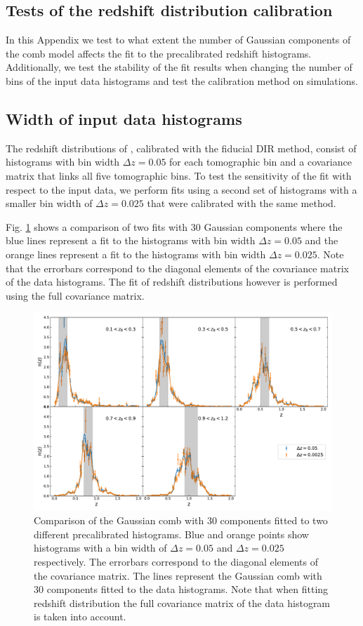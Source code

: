 \documentclass{aa}
\begin{document}
\begin{appendix}
\section{Tests of the redshift distribution calibration}
\label{ap:calibration}
In this Appendix we test to what extent the number of Gaussian components of the comb model affects the fit to the precalibrated redshift histograms. Additionally, we test the stability of the fit results when changing the number of bins of the input data histograms and test the calibration method on simulations.
\subsection{Width of input data histograms}
\label{ap:calibration_input}
The redshift distributions of \cite{hildebrandt18}, calibrated with the fiducial DIR method, consist of histograms with bin width $\Delta z = 0.05$ for each tomographic bin and a covariance matrix that links all five tomographic bins. To test the sensitivity of the fit with respect to the input data, we perform fits using a second set of histograms with a smaller bin width of $\Delta z = 0.025$ that were calibrated with the same method. 

Fig. \ref{fig:120vs240} shows a comparison of two fits with 30 Gaussian components where the blue lines represent a fit to the histograms with bin width $\Delta z = 0.05$ and the orange lines represent a fit to the histograms with bin width $\Delta z = 0.025$. Note that the errorbars correspond to the diagonal elements of the covariance matrix of the data histograms. The fit of redshift distributions however is performed using the full covariance matrix.
\begin{figure}
\centering
\includegraphics[width=\linewidth]{plots/calibration_bin_width.pdf}
\caption{Comparison of the Gaussian comb with 30 components fitted to two different precalibrated histograms. Blue and orange points show histograms with a bin width of $\Delta z = 0.05$ and $\Delta z = 0.025$ respectively. The errorbars correspond to the diagonal elements of the covariance matrix. The lines represent the Gaussian comb with 30 components fitted to the data histograms. Note that when fitting redshift distribution the full covariance matrix of the data histogram is taken into account.}
\label{fig:120vs240}
\end{figure}


\end{appendix}
\end{document}
